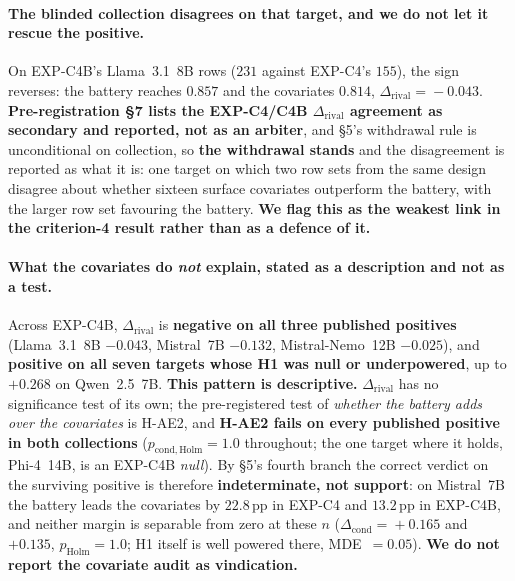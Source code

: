 \paragraph{The blinded collection disagrees on that target, and we do not let it rescue the positive.} On EXP-C4B's Llama~3.1~8B rows ($231$ against EXP-C4's $155$), the sign reverses: the battery reaches $0.857$ and the covariates $0.814$, $\Delta_{\mathrm{rival}}\!=\!-0.043$. \textbf{Pre-registration \S7 lists the EXP-C4/C4B $\Delta_{\mathrm{rival}}$ agreement as secondary and reported, not as an arbiter}, and \S5's withdrawal rule is unconditional on collection, so \textbf{the withdrawal stands} and the disagreement is reported as what it is: one target on which two row sets from the same design disagree about whether sixteen surface covariates outperform the battery, with the larger row set favouring the battery. \textbf{We flag this as the weakest link in the criterion-4 result rather than as a defence of it.}

\paragraph{What the covariates do \emph{not} explain, stated as a description and not as a test.} Across EXP-C4B, $\Delta_{\mathrm{rival}}$ is \textbf{negative on all three published positives} (Llama~3.1~8B $-0.043$, Mistral~7B $-0.132$, Mistral-Nemo~12B $-0.025$), and \textbf{positive on all seven targets whose H1 was null or underpowered}, up to $+0.268$ on Qwen~2.5~7B. \textbf{This pattern is descriptive.} $\Delta_{\mathrm{rival}}$ has no significance test of its own; the pre-registered test of \emph{whether the battery adds over the covariates} is H-AE2, and \textbf{H-AE2 fails on every published positive in both collections} ($p_{\mathrm{cond,Holm}}\!=\!1.0$ throughout; the one target where it holds, Phi-4~14B, is an EXP-C4B \emph{null}). By \S5's fourth branch the correct verdict on the surviving positive is therefore \textbf{indeterminate, not support}: on Mistral~7B the battery leads the covariates by $22.8$\,pp in EXP-C4 and $13.2$\,pp in EXP-C4B, and neither margin is separable from zero at these $n$ ($\Delta_{\mathrm{cond}}\!=\!+0.165$ and $+0.135$, $p_{\mathrm{Holm}}\!=\!1.0$; H1 itself is well powered there, MDE~$=\!0.05$). \textbf{We do not report the covariate audit as vindication.}

